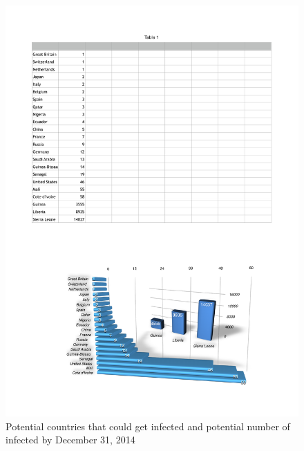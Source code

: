 \documentclass[10pt, journal,onecolumn]{IEEEtran}
\begin{document}
\begin{figure}[ht]
\centering
\includegraphics[scale=.6]{countriesInfected.pdf}
\caption{Potential countries that could get infected and potential number of infected by December 31, 2014}
\label{Fig:world_infected}
\end{figure}
\end{document}
